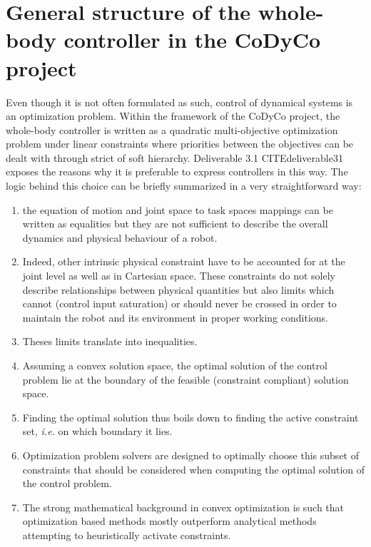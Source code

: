 \documentclass[12pt,a4paper,twoside]{article}
\begin{document}
\section{General structure of the whole-body controller in the CoDyCo project}

Even though it is not often formulated as such, control of dynamical systems is an optimization problem. Within the framework of the CoDyCo project, the whole-body controller is written as a quadratic multi-objective optimization problem under linear constraints where priorities between the objectives can be dealt with through strict of soft hierarchy. Deliverable 3.1 CITE{deliverable31} exposes the reasons why it is preferable to express controllers in this way. The logic behind this choice can be briefly summarized in a very straightforward way:
\begin{enumerate}
\item the equation of motion and joint space to task spaces mappings can be written as equalities but they are not sufficient to describe the overall dynamics and physical behaviour of a robot.
\item Indeed, other intrinsic physical constraint have to be accounted for at the joint level as well as in Cartesian space. These constraints do not solely describe relationships between physical quantities but also limits which cannot (control input saturation) or should never be crossed in order to maintain the robot and its environment in proper working conditions.
\item Theses limits translate into inequalities.
\item Assuming a convex solution space, the optimal solution of the control problem lie at the boundary of the feasible (constraint compliant) solution space.
\item Finding the optimal solution thus boils down to finding the active constraint set, \textit{i.e.} on which boundary it lies.
\item Optimization problem solvers are designed to optimally choose this subset of constraints that should be considered when computing the optimal solution of the control problem.
\item The strong mathematical background in convex optimization is such that optimization based methods mostly outperform analytical methods attempting to heuristically activate constraints.
\end{enumerate}
\end{document}
